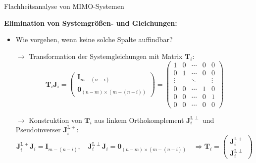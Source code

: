 \documentclass[
	ngerman,
	10pt,				%
	aspectratio=169 	%
]{beamer}
\begin{document}
\begin{frame}[t,fragile,label=Flachheit_4]{\large Flachheitsanalyse von MIMO-Systemen}
	
	\textbf{Elimination von Systemgrößen- und Gleichungen:}
	
	\begin{itemize}
		\item  Wie vorgehen, wenn keine solche Spalte auffindbar?
		\pause
		\item[$\rightarrow$] Transformation der Systemgleichungen mit Matrix $\mathbf{T}_i$: \\
		\begin{equation*}
			\mathbf{T}_i \mathbf{J}_i = 
			\begin{pmatrix}
				\mathbf{I}_{m-(n-i)} \\
				\hline
				\mathbf{0}_{(n-m) \times (m-(n-i))}
			\end{pmatrix}
			=
			\begin{pmatrix}
				1 & 0 & \cdots & 0 & 0 \\
				0 & 1 & \cdots & 0 & 0 \\
				\vdots & & \ddots &  & \vdots \\
				0 & 0 & \cdots & 1 & 0 \\
				0 & 0 & \cdots & 0 & 1 \\
				\hline
				0 & 0 & \cdots & 0 & 0
			\end{pmatrix}
		\end{equation*}
		\pause
		\item[$\rightarrow$] Konstruktion von $\mathbf{T}_i$ aus linkem Orthokomplement $\mathbf{J}_i^{\mathrm{L} \perp}$ und Pseudoinverser $\mathbf{J}_i^{\mathrm{L} +}$: \\
		\begin{equation*}
			\mathbf{J}_i^{\mathrm{L} +} \mathbf{J}_i = \mathbf{I}_{m-(n-i)}, \quad
			\mathbf{J}_i^{\mathrm{L} \perp} \mathbf{J}_i = \mathbf{0}_{(n-m) \times (m-(n-i))} \quad
			\Rightarrow \mathbf{T}_i = 
			\begin{pmatrix}
				\mathbf{J}_i^{\mathrm{L} +} \\
				\mathbf{J}_i^{\mathrm{L} \perp}
			\end{pmatrix}
		\end{equation*}
	\end{itemize}
	
\end{frame}

\end{document}
